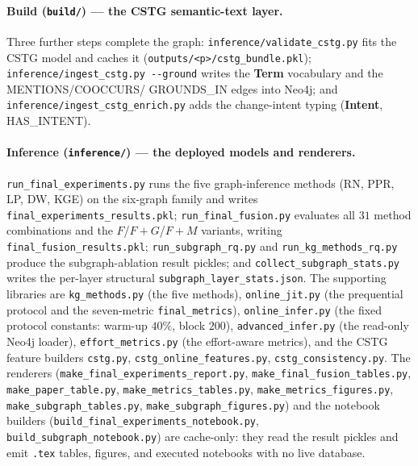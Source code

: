 \documentclass[11pt,a4paper]{article}
\newcommand{\code}[1]{\texttt{#1}}
\newcommand{\node}[1]{\textcolor{kgblue}{\textbf{#1}}}
\newcommand{\edge}[1]{\textsc{#1}}
\begin{document}
	\paragraph{Build (\code{build/}) --- the CSTG semantic-text layer.}
	Three further steps complete the graph:
	\code{inference/validate\_cstg.py} fits the CSTG model and caches it
	(\code{outputs/<p>/cstg\_bundle.pkl}); \code{inference/ingest\_cstg.py -{-}ground}
	writes the \node{Term} vocabulary and the \edge{MENTIONS}/\edge{COOCCURS}/
	\edge{GROUNDS\_IN} edges into Neo4j; and \code{inference/ingest\_cstg\_enrich.py}
	adds the change-intent typing (\node{Intent}, \edge{HAS\_INTENT}).

	\paragraph{Inference (\code{inference/}) --- the deployed models and renderers.}
	\code{run\_final\_experiments.py} runs the five graph-inference methods
	(RN, PPR, LP, DW, KGE) on the six-graph family and writes
	\code{final\_experiments\_results.pkl}; \code{run\_final\_fusion.py} evaluates all
	$31$ method combinations and the $F$/$F{+}G$/$F{+}M$ variants, writing
	\code{final\_fusion\_results.pkl}; \code{run\_subgraph\_rq.py} and
	\code{run\_kg\_methods\_rq.py} produce the subgraph-ablation result pickles; and
	\code{collect\_subgraph\_stats.py} writes the per-layer structural
	\code{subgraph\_layer\_stats.json}. The supporting libraries are
	\code{kg\_methods.py} (the five methods), \code{online\_jit.py} (the prequential
	protocol and the seven-metric \code{final\_metrics}), \code{online\_infer.py} (the
	fixed protocol constants: warm-up $40\%$, block $200$), \code{advanced\_infer.py}
	(the read-only Neo4j loader), \code{effort\_metrics.py} (the effort-aware
	metrics), and the CSTG feature builders \code{cstg.py},
	\code{cstg\_online\_features.py}, \code{cstg\_consistency.py}. The renderers
	(\code{make\_final\_experiments\_report.py}, \code{make\_final\_fusion\_tables.py},
	\code{make\_paper\_table.py}, \code{make\_metrics\_tables.py},
	\code{make\_metrics\_figures.py}, \code{make\_subgraph\_tables.py},
	\code{make\_subgraph\_figures.py}) and the notebook builders
	(\code{build\_final\_experiments\_notebook.py}, \code{build\_subgraph\_notebook.py})
	are cache-only: they read the result pickles and emit \code{.tex} tables,
	figures, and executed notebooks with no live database.
\end{document}
